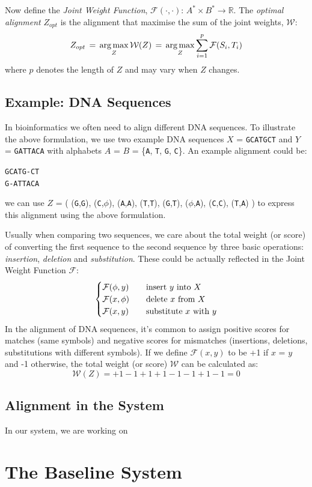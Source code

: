 Now define the \textit{Joint Weight Function}, $\mathcal{F}(\cdot,\cdot)$: $A^* \times B^* \to \mathbb{R}$. The \textit{optimal alignment} $Z_{opt}$ is the alignment that maximise the sum of the joint weights, $\mathcal{W}$:
\begin{equation}
  Z_{opt} \,=\, \operatorname*{arg\,max}_{Z} \mathcal{W}(Z) \,=\, \operatorname*{arg\,max}_{Z} \sum_{i=1}^{p} \mathcal{F}(S_i,T_i)
\end{equation}
where $p$ denotes the length of $Z$ and may vary when $Z$ changes.

\subsection{Example: DNA Sequences}

In bioinformatics we often need to align different DNA sequences. To illustrate the above formulation, we use two example DNA sequences $X$ = \texttt{GCATGCT} and $Y$ = \texttt{GATTACA} with alphabets $A$ = $B$ = \{\texttt{A}, \texttt{T}, \texttt{G}, \texttt{C}\}. An example alignment could be:
\begin{center}
  \texttt{GCATG-CT}\\
  \texttt{G-ATTACA}
\end{center}
we can use $Z$ = (
  (\texttt{G},\texttt{G}),
  (\texttt{C},$\phi$),
  (\texttt{A},\texttt{A}),
  (\texttt{T},\texttt{T}),
  (\texttt{G},\texttt{T}),
  ($\phi$,\texttt{A}),
  (\texttt{C},\texttt{C}),
  (\texttt{T},\texttt{A})
) to express this alignment using the above formulation.

Usually when comparing two sequences, we care about the total weight (or score) of converting the first sequence to the second sequence by three basic operations: \textit{insertion}, \textit{deletion} and \textit{substitution}. These could be actually reflected in the Joint Weight Function $\mathcal{F}$:
\[
  \begin{cases}
    \mathcal{F}(\phi,y) & \text{\quad insert } y \text{ into } X \\
    \mathcal{F}(x,\phi) & \text{\quad delete } x \text{ from } X \\
    \mathcal{F}(x,y) & \text{\quad substitute } x \text{ with } y
  \end{cases}
\]
In the alignment of DNA sequences, it's common to assign positive scores for matches (same symbols) and negative scores for mismatches (insertions, deletions, substitutions with different symbols). If we define $\mathcal{F}(x,y)$ to be +1 if $x$ = $y$ and -1 otherwise, the total weight (or score) $\mathcal{W}$ can be calculated as:
\[ \mathcal{W}(Z) = + 1 - 1 + 1 + 1 - 1 - 1 + 1 - 1 = 0 \]

\subsection{Alignment in the System}

In our system, we are working on 

\section{The Baseline System}



